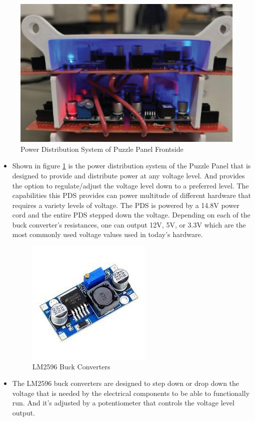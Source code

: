 \documentclass[a4paper, 10pt]{article}
\begin{document}
		\begin{figure} [h]
			\centering
			\includegraphics[scale=0.75]{Photos/Puzzle Panel PDS front}
			\caption{Power Distribution System of Puzzle Panel Frontside}
			\label{PDS_of_Puzzle}
		\end{figure}

		\begin{itemize}
		\item
		Shown in figure \ref{PDS_of_Puzzle} is the power distribution system of the Puzzle Panel that is designed to provide and distribute power at any voltage level. And provides the option to regulate/adjust the voltage level down to a preferred level. The capabilities this PDS provides can power multitude of different hardware that requires a variety levels of voltage. The PDS is powered by a 14.8V power cord and the entire PDS stepped down the voltage. Depending on each of the buck converter's resistances, one can output 12V, 5V, or 3.3V which are the most commonly used voltage values used in today's hardware.

		\begin{figure} [h]
			\centering
			\includegraphics[scale=0.4]{Photos/LM2596 bucks}
			\caption{LM2596 Buck Converters}
		\end{figure}

		\item
		The LM2596 buck converters are designed to step down or drop down the voltage that is needed by the electrical components to be able to functionally run. And it's adjusted by a potentiometer that controls the voltage level output.
		\end{itemize}
\end{document}
